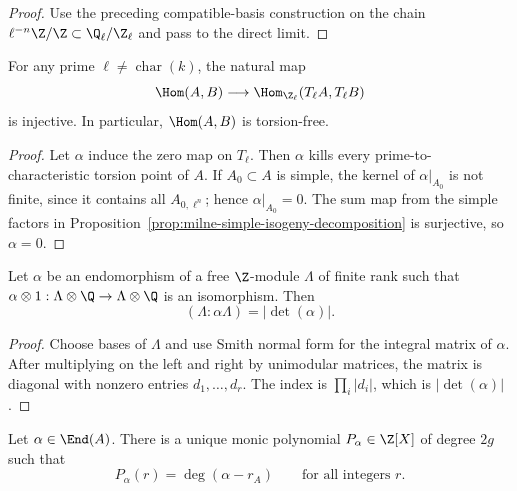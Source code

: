 \begin{proof}
Use the preceding compatible-basis construction on the chain
$\ell^{-n}\Z/\Z\subset\Q_\ell/\Z_\ell$ and pass to the direct limit.
\end{proof}

\begin{lemma}
\label{lem:milne-tate-injective}

For any prime $\ell\ne\operatorname{char}(k)$, the natural map
\[
\Hom(A,B)\longrightarrow\Hom_{\Z_\ell}(T_\ell A,T_\ell B)
\]
is injective.  In particular, $\Hom(A,B)$ is torsion-free.
\end{lemma}

\begin{proof}
Let $\alpha$ induce the zero map on $T_\ell$.  Then $\alpha$ kills every
prime-to-characteristic torsion point of $A$.  If $A_0\subset A$ is simple,
the kernel of $\alpha|_{A_0}$ is not finite, since it contains all
$A_{0,\ell^n}$; hence $\alpha|_{A_0}=0$.  The sum map from the simple factors
in Proposition~\ref{prop:milne-simple-isogeny-decomposition} is surjective,
so $\alpha=0$.
\end{proof}

\begin{lemma}
\label{lem:milne-index-determinant}

\leanok
Let $\alpha$ be an endomorphism of a free $\Z$-module $\Lambda$ of finite
rank such that $\alpha\otimes1:\Lambda\otimes\Q\to\Lambda\otimes\Q$ is an
isomorphism.  Then
\[
(\Lambda:\alpha\Lambda)=|\det(\alpha)|.
\]
\end{lemma}

\begin{proof}
\leanok
Choose bases of $\Lambda$ and use Smith normal form for the integral matrix
of $\alpha$.  After multiplying on the left and right by unimodular matrices,
the matrix is diagonal with nonzero entries $d_1,\ldots,d_r$.  The index is
$\prod_i|d_i|$, which is $|\det(\alpha)|$.
\end{proof}

\begin{theorem}
\label{thm:milne-endomorphism-characteristic-polynomial}

Let $\alpha\in\End(A)$.  There is a unique monic polynomial
$P_\alpha\in\Z[X]$ of degree $2g$ such that
\[
P_\alpha(r)=\deg(\alpha-r_A)
\qquad\text{for all integers }r.
\]
\end{theorem}

